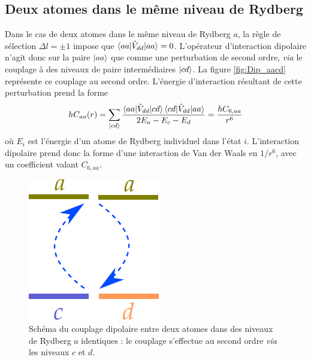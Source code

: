 \subsection{Deux atomes dans le même niveau de Rydberg}\label{subsec:interaction_same_level}
Dans le cas de deux atomes dans le même niveau de Rydberg $a$, la règle de sélection $\Delta l = \pm 1$ impose que $\braket{aa|\hat{V}_{dd}|aa} = 0$.
L'opérateur d'interaction dipolaire n'agit donc sur la paire $\ket{aa}$ que comme une perturbation de second ordre, \textit{via} le couplage à des niveaux de paire intermédiaires $\ket{cd}$.
La figure \eqref{fig:Dip_aacd} représente ce couplage au second ordre.
L'énergie d'interaction résultant de cette perturbation prend la forme
\begin{equation}\label{eq:VdW_aacd}
hC_{aa}(r)=\sum_{\ket{cd}}{\frac{\braket{aa|\hat{V}_{dd}|cd}\braket{cd|\hat{V}_{dd}|aa}}{2E_a - E_c - E_d}}  = \frac{hC_{6,aa}}{r^6}
\end{equation}
où $E_i$ est l'énergie d'un atome de Rydberg individuel dans l'état $i$.
L'interaction dipolaire prend donc la forme d'une interaction de Van der Waals en $1/r^6$, avec un coefficient valant $C_{6,aa}$.

\begin{figure}[!h]
\centering

\includegraphics[width=0.3\linewidth]{figures/theory/dipole_coupling_aacd}
\caption[Couplage dipolaire entre mêmes niveaux de Rydberg]{Schéma du couplage dipolaire entre deux atomes dans des niveaux de Rydberg $a$ identiques : le couplage s'effectue au second ordre \textit{via} les niveaux $c$ et $d$.}
\label{fig:Dip_aacd}
\end{figure}

